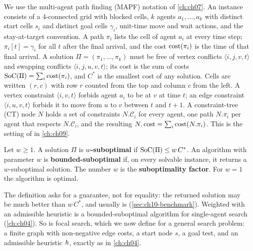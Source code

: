 We use the multi-agent path finding (MAPF) notation of \cref{ch:ch07}. An instance consists of a
4-connected grid with blocked cells, $k$ agents $a_1, \dots, a_k$ with distinct
start cells $s_i$ and distinct goal cells $\gamma_i$, unit-time move and wait
actions, and the stay-at-target convention. A path $\pi_i$ lists the cell of
agent $a_i$ at every time step; $\pi_i[t] = \gamma_i$ for all $t$ after the
final arrival, and the cost $\operatorname{cost}(\pi_i)$ is the time of that final arrival.
A solution $\Pi = (\pi_1, \dots, \pi_k)$ must be free of vertex conflicts
$\langle i, j, v, t\rangle$ and swapping conflicts $\langle i, j, u, v, t\rangle$;
its cost is the sum of costs $\mathrm{SoC}(\Pi) = \sum_i \operatorname{cost}(\pi_i)$, and $C^*$ is
the smallest cost of any solution. Cells are written $(r, c)$ with row $r$
counted from the top and column $c$ from the left. A vertex constraint
$\langle i, v, t\rangle$ forbids agent $a_i$ to be at $v$ at time $t$; an edge
constraint $\langle i, u, v, t\rangle$ forbids it to move from $u$ to $v$
between $t$ and $t+1$. A constraint-tree (CT) node $N$ holds a set of
constraints $N.\mathcal{C}_i$ for every agent, one path $N.\pi_i$ per agent
that respects $N.\mathcal{C}_i$, and the resulting $N.\operatorname{cost} = \sum_i
\operatorname{cost}(N.\pi_i)$. This is the setting of \cbs in \cref{ch:ch09}.

\begin{definition}
\label{def:ch10-bounded}
Let $w \ge 1$. A solution $\Pi$ is \textbf{$w$-suboptimal} if $\mathrm{SoC}(\Pi) \le w\,C^*$. An algorithm
with parameter $w$ is \textbf{bounded-suboptimal} if, on every solvable instance, it returns a
$w$-suboptimal solution. The number $w$ is the \textbf{suboptimality
factor}. For $w = 1$ the algorithm is optimal.
\end{definition}

The definition asks for a guarantee, not for equality: the returned solution
may be much better than $w\,C^*$, and usually is
(\cref{sec:ch10-benchmark}). Weighted \astar with an admissible heuristic is a
bounded-suboptimal algorithm for single-agent search (\cref{ch:ch04}). So is
focal search, which we now define for a general search problem: a finite
graph with non-negative edge costs, a start node $s$, a goal test, and an
admissible heuristic $h$, exactly as in \cref{ch:ch04}.

